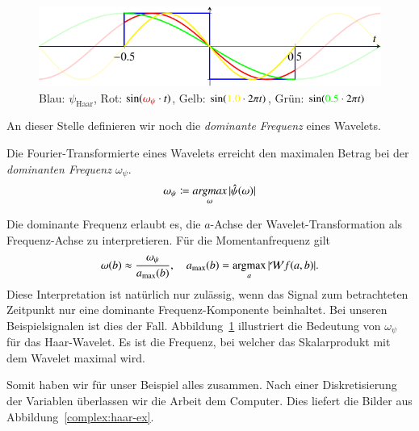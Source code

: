 \begin{figure}
	\centering
	\includegraphics{papers/complex/images/haar_dom.pdf}
	
	\caption{Blau: $\psi_\text{Haar}$, Rot: $\sin ({\color{red}\omega_\psi}\cdot t)$, Gelb: $\sin ({\color{yellow}1.0}\cdot 2\pi t)$, Grün: $\sin ({\color{green}0.5}\cdot 2\pi t)$}
	\label{complex:dom-freq}
\end{figure}
An dieser Stelle definieren wir noch die \emph{dominante Frequenz} eines Wavelets.
\begin{definition}
	Die Fourier-Transformierte eines Wavelets erreicht den maximalen Betrag bei der \emph{dominanten Frequenz $\omega_\psi$}.
	\begin{equation}
		\omega_\psi \coloneqq \underset{\omega}{\text{\emph{argmax}}} \, |\hat\psi(\omega)|
	\end{equation}
	
\end{definition}

Die dominante Frequenz erlaubt es, die $a$-Achse der Wavelet-Transformation als Frequenz-Achse zu interpretieren.
Für die Momentanfrequenz gilt
\[
	\omega(b) \approx \frac{\omega_\psi}{a_\text{max}(b)},
	\quad 
	a_\text{max}(b)
	= 
	\underset{a}{\text{argmax}} \, |\!\Wave f(a,b)|.
\]
Diese Interpretation ist natürlich nur zulässig, wenn das Signal zum betrachteten Zeitpunkt nur eine dominante Frequenz-Komponente beinhaltet.
Bei unseren Beispielsignalen ist dies der Fall.
Abbildung~\ref{complex:dom-freq} illustriert die Bedeutung von $\omega_\psi$ für das Haar-Wavelet.
Es ist die Frequenz, bei welcher das Skalarprodukt mit dem Wavelet maximal wird.

Somit haben wir für unser Beispiel alles zusammen.
Nach einer Diskretisierung der Variablen überlassen wir die Arbeit dem Computer.
Dies liefert die Bilder aus Abbildung~\ref{complex:haar-ex}.

